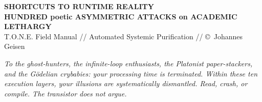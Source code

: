 \documentclass[12pt,a4paper]{article}
\begin{document}
\begin{tcolorbox}[colback=lightbg, colframe=abysred, arc=0mm, width=\linewidth, boxrule=3pt, top=12pt, bottom=12pt]
    \begin{center}
        {\Huge \bfseries \color{pitchblack} SHORTCUTS TO RUNTIME REALITY} \\[0.3cm]
        {\large \bfseries \color{abysred} HUNDRED poetic ASYMMETRIC ATTACKS on ACADEMIC LETHARGY} \\[0.1cm]
        {\small \ttfamily \color{gray} T.O.N.E. Field Manual // Automated Systemic Purification // \copyright\ Johannes Geisen}
    \end{center}
\end{tcolorbox}

\vspace{0.3cm}

\begin{tcolorbox}[colback=lightbg, colframe=neonorange, arc=0mm, title=\textbf{\color{pitchblack}COMPILER BOOT PREAMBLE}]
    \small\itshape\color{pitchblack}
    To the ghost-hunters, the infinite-loop enthusiasts, the Platonist paper-stackers, and the G\"odelian crybabies: your processing time is terminated. Within these ten execution layers, your illusions are systematically dismantled. Read, crash, or compile. The transistor does not argue.
\end{tcolorbox}
\end{document}
